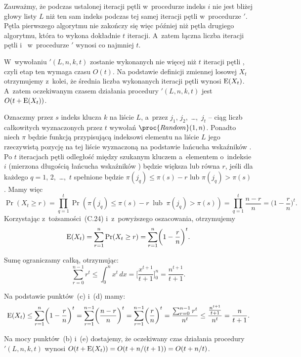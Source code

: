 Zauważmy, że podczas ustalonej iteracji pętli  w~procedurze  indeks $i$ nie jest bliżej głowy listy $L$ niż ten sam indeks podczas tej samej iteracji pętli  w~procedurze $'$. Pętla pierwszego algorytmu nie zakończy się więc później niż pętla drugiego algorytmu, która to wykona dokładnie $t$ iteracji. A~zatem łączna liczba iteracji pętli  i~ w~procedurze $'$ wynosi co najmniej $t$.

\subproblem %
W~wywołaniu $'(L,n,k,t)$ zostanie wykonanych nie więcej niż $t$ iteracji pętli , czyli etap ten wymaga czasu $O(t)$. Na podstawie definicji zmiennej losowej $X_t$ otrzymujemy z~kolei, że średnia liczba wykonanych iteracji pętli  wynosi $\operatorname{E}(X_t)$. A~zatem oczekiwanym czasem działania procedury $'(L,n,k,t)$ jest $O(t+\operatorname{E}(X_t))$.

\subproblem %
Oznaczmy przez $s$ indeks klucza $k$ na liście $L$, a~przez $j_1$, $j_2$,~\dots,~$j_t$ -- ciąg liczb całkowitych wyznaczonych przez $t$ wywołań $\proc{Random}(1,n)$. Ponadto niech $\pi$ będzie funkcją przypisującą indeksowi elementu na liście $L$ jego rzeczywistą pozycję na tej liście wyznaczoną na podstawie łańcucha wskaźników . Po $t$ iteracjach pętli  odległość między szukanym kluczem a~elementem o~indeksie $i$ (mierzona długością łańcucha wskaźników ) będzie większa lub równa $r$, jeśli dla każdego $q=1$, 2,~\dots,~$t$ spełnione będzie $\pi(j_q)\le\pi(s)-r$ lub $\pi(j_q)>\pi(s)$. Mamy więc
\[
	\Pr(X_t\ge r) = \prod_{q=1}^t\Pr(\pi(j_q)\le\pi(s)-r\;\;\text{lub}\;\;\pi(j_q)>\pi(s)) = \prod_{q=1}^t\frac{n-r}{n} = \biggl(1-\frac{r}{n}\biggr)^t.
\]
Korzystając z~tożsamości~(C.24) i~z~powyższego oszacowania, otrzymujemy
\[
	\operatorname{E}(X_t) = \sum_{r=1}^n\Pr(X_t\ge r) = \sum_{r=1}^n\biggl(1-\frac{r}{n}\biggr)^t.
\]

\subproblem %
Sumę ograniczamy całką, otrzymując:
\[
	\sum_{r=0}^{n-1}r^t \le \int_0^nx^t\,dx = \biggl[\frac{x^{t+1}}{t+1}\biggr]_0^n = \frac{n^{t+1}}{t+1}.
\]

\subproblem %
Na podstawie punktów~(c) i~(d) mamy:
\[
	\operatorname{E}(X_t) \le \sum_{r=1}^n\biggl(1-\frac{r}{n}\biggr)^t = \sum_{r=1}^{n-1}\biggl(\frac{n-r}{n}\biggr)^t = \sum_{r=1}^{n-1}\biggl(\frac{r}{n}\biggr)^t = \frac{\sum_{r=0}^{n-1}r^t}{n^t} \le \frac{\frac{n^{t+1}}{t+1}}{n^t} = \frac{n}{t+1}.
\]

\subproblem %
Na mocy punktów~(b) i~(e) dostajemy, że oczekiwany czas działania procedury $'(L,n,k,t)$ wynosi $O(t+\operatorname{E}(X_t))=O(t+n/(t+1))=O(t+n/t)$.

